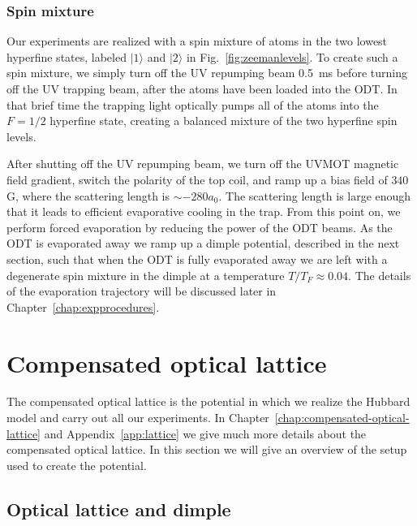 \subsubsection{Spin mixture} 

Our experiments are realized with a spin mixture of atoms in the two lowest
hyperfine states,  labeled $|1\rangle$ and $|2\rangle$ in
Fig.~\ref{fig:zeemanlevels}.   To create such a spin mixture, we simply turn
off the UV repumping beam 0.5~ms before turning off the UV trapping beam, after
the atoms have been loaded into the ODT.   In that brief time the trapping light
optically pumps all of the atoms into the $F=1/2$ hyperfine state, creating a
balanced mixture of the two hyperfine spin levels. 

After shutting off the UV repumping beam, we turn off the UVMOT magnetic field
gradient, switch the polarity of the top coil,  and ramp up a bias field of
$340~$G, where the scattering length is $\sim -280a_{0}$. The scattering
length is large enough that it leads to efficient evaporative cooling in the
trap.   From this point on, we perform forced evaporation by reducing the power
of the ODT beams.  As the ODT is evaporated away we ramp up a dimple potential,
described in the next section,  such that when the ODT is fully evaporated
away we are left with a degenerate spin mixture in the dimple at a temperature
$T/T_{F}\approx 0.04 $.  The details of the evaporation trajectory will be
discussed later in Chapter~\ref{chap:expprocedures}. 


\section{Compensated optical lattice}

The compensated optical lattice is the potential in which we realize the
Hubbard model and  carry out all our experiments.   In
Chapter~\ref{chap:compensated-optical-lattice} and Appendix~\ref{app:lattice}
we give much more details about the compensated optical lattice.  In this
section we will give an overview of the setup used to create the potential.


\subsection{Optical lattice and dimple}

